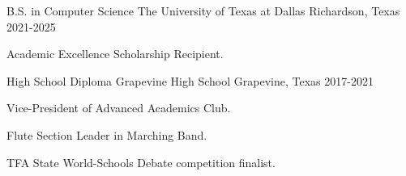 
\begin{cventries}

\cventry
{B.S. in Computer Science}
{The University of Texas at Dallas}
{Richardson, Texas}
{2021-2025}
{
\begin{cvitems}
\item {Academic Excellence Scholarship Recipient.}
\end{cvitems}
}

\cventry
{High School Diploma}
{Grapevine High School}
{Grapevine, Texas}
{2017-2021}
{
\begin{cvitems}
\item {Vice-President of Advanced Academics Club.}
\item {Flute Section Leader in Marching Band.}
\item {TFA State World-Schools Debate competition finalist.}
\end{cvitems}
}


\end{cventries}
